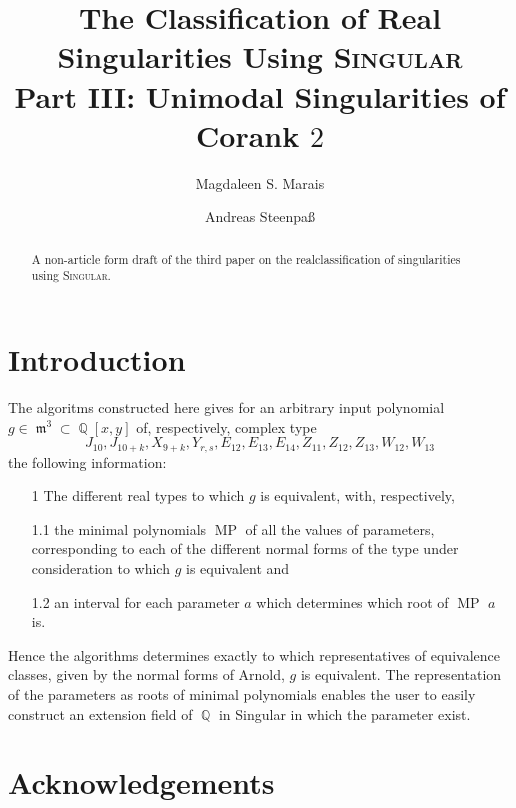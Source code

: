\documentclass[noend]{amsproc}
\title[The Classification of Real Singularities Using \textsc{Singular}, %
Part III]%
{The Classification of Real Singularities Using \textsc{Singular}\\
Part III: Unimodal Singularities of Corank $2$}
\author{Magdaleen S. Marais}
\author{Andreas Steenpa\ss}
\theoremstyle{definition}
\DeclareMathOperator{\MP}{MP}
\DeclareMathOperator{\m}{\mathfrak{m}}
\DeclareMathOperator{\Q}{\mathbb{Q}}
\begin{document}
\begin{abstract}
A non-article form draft of the third paper on the realclassification of singularities using  \textsc{Singular}.
\end{abstract}

\maketitle


\section{Introduction}
The algoritms constructed here gives for an arbitrary input polynomial $g\in\m^3\subset\Q[x,y]$ of, respectively, complex type \[J_{10}, J_{10+k}, X_{9+k}, Y_{r,s}, E_{12}, E_{13}, E_{14}, Z_{11}, Z_{12}, Z_{13}, W_{12}, W_{13}\] the following information:

\begin{itemize}
\item[1] The different real types to which $g$ is equivalent, with, respectively,
\item [1.1] the minimal polynomials $\MP$ of all the values of parameters, corresponding to each of the different normal forms of the type under consideration to which $g$ is equivalent and
\item[1.2] an interval for each parameter $a$ which determines which root of $\MP$ $a$ is.
\end{itemize}

Hence the algorithms determines exactly to which representatives of equivalence classes, given by the normal forms of Arnold, $g$ is equivalent. The representation of the parameters as roots of minimal polynomials enables the user to easily construct an extension field of $\Q$ in Singular in which the parameter exist. 
\section{Acknowledgements}
\end{document}
